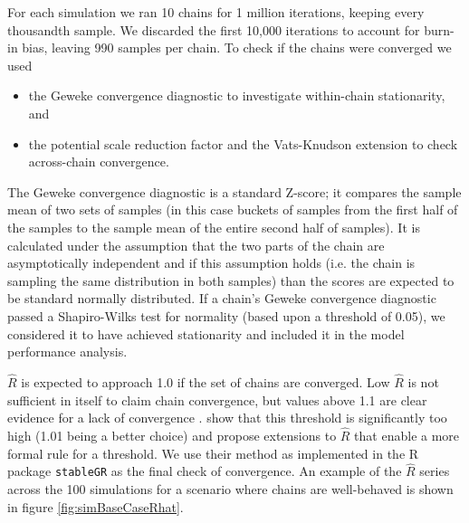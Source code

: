 \documentclass[]{article}
\begin{document}
For each simulation we ran 10 chains for 1 million iterations, keeping every thousandth sample. We discarded the first 10,000 iterations to account for burn-in bias, leaving 990 samples per chain. To check if the chains were converged we used
\begin{itemize}
	\item the Geweke convergence diagnostic \citep{geweke1991evaluating} to investigate within-chain stationarity, and
	\item the potential scale reduction factor \citep[$\hat{R}$, ][]{gelman1992inference} and the Vats-Knudson extension \citep[\emph{stable $\hat{R}$},][]{vats2018revisiting} to check across-chain convergence.
\end{itemize}
The Geweke convergence diagnostic is a standard Z-score; it compares the sample mean of two sets of samples (in this case buckets of samples from the first half of the samples to the sample mean of the entire second half of samples). It is calculated under the assumption that the two parts of the chain are asymptotically independent and if this assumption holds (i.e. the chain is sampling the same distribution in both samples) than the scores are expected to be standard normally distributed. If a chain's Geweke convergence diagnostic passed a Shapiro-Wilks test for normality \citep{shapiro1965analysis} (based upon a threshold of 0.05), we considered it to have achieved stationarity and included it in the model performance analysis. 

$\hat{R}$ is expected to approach 1.0 if the set of chains are converged. Low $\hat{R}$ is not sufficient in itself to claim chain convergence, but values above 1.1 are clear evidence for a lack of convergence \citep{gelman2013bayesian}. \cite{vats2018revisiting} show that this threshold is significantly too high (1.01 being a better choice) and propose extensions to $\hat{R}$ that enable a more formal rule for a threshold. We use their method as implemented in the R package \texttt{stableGR} \citep{knudson20202stableGR} as the final check of convergence. An example of the $\hat{R}$ series across the 100 simulations for a scenario where chains are well-behaved is shown in figure \ref{fig:simBaseCaseRhat}.
\end{document}
